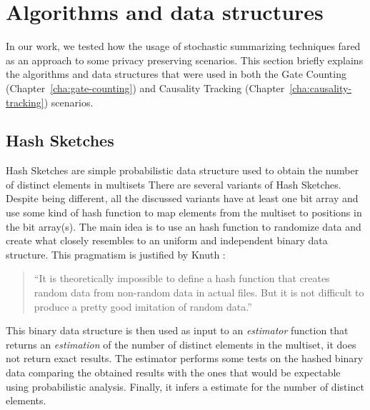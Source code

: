 
\section{Algorithms and data structures}
\label{sec:algorithms_and_data_structures}
In our work, we tested how the usage of stochastic summarizing
techniques fared as an approach to some privacy preserving scenarios.
This section briefly explains the algorithms and data structures that
were used in both the Gate Counting (Chapter~\ref{cha:gate-counting})
and Causality Tracking (Chapter~\ref{cha:causality-tracking}) scenarios.

\subsection{Hash Sketches}
\label{sec:hash_sketches}

Hash Sketches are simple probabilistic data structure used to obtain
the number of distinct elements in multisets There are several
variants of Hash Sketches. Despite being different, all the discussed
variants have at least one bit array and use some kind of
hash function to map elements from the multiset to positions in the
bit array(s). The main idea is to use an hash function to
randomize data and create what closely resembles to an uniform and
independent binary data structure. This pragmatism is justified by
Knuth \cite{knuth1998art}:
\begin{quotation}
``It is theoretically impossible to define a hash
function that creates random data from non-random data in actual
files. But it is not difficult to produce a pretty good imitation of
random data.''
\end{quotation}
This binary data structure is then used as input to an
\emph{estimator} function that returns an \emph{estimation} of the
number of distinct elements in the multiset, it does not return exact
results. The estimator performs some tests on the hashed
binary data comparing the obtained results with the ones that would be
expectable using probabilistic analysis. Finally, it infers a estimate
for the number of distinct elements.

